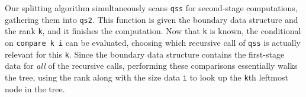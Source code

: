 \begin{abstrsyn}
Our splitting algorithm simultaneously scans \texttt{qss} for second-stage
computations, gathering them into \texttt{qs2}. This function is given the boundary
data structure and the rank \texttt{k}, and it finishes the computation. Now that
\texttt{k} is known, the conditional on \texttt{compare k i} can be evaluated,
choosing which recursive call of \texttt{qss} is actually relevant for this
\texttt{k}. Since the boundary data structure contains the first-stage data for
\emph{all} of the recursive calls, performing these comparisons essentially
walks the tree, using the rank along with the size data \texttt{i} to
look up the \texttt{k}th leftmost node in the tree.


\end{abstrsyn}
